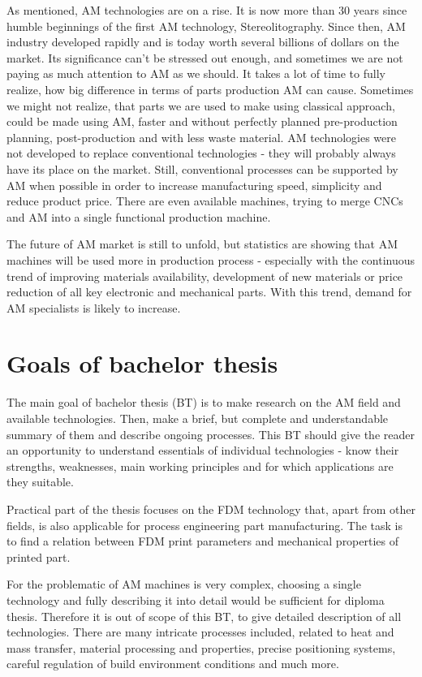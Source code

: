 \documentclass[a4paper, 11pt, reqno]{report}
\begin{document}
	As mentioned, AM technologies are on a rise. It is now more than 30 years since humble beginnings of the first AM technology, Stereolitography. Since then, AM industry developed rapidly and is today worth several billions of dollars on the market. Its significance can't be stressed out enough, and sometimes we are not paying as much attention to AM as we should. It takes a lot of time to fully realize, how big difference in terms of parts production AM can cause. Sometimes we might not realize, that parts we are used to make using classical approach, could be made using AM, faster and without perfectly planned pre-production planning, post-production and with less waste material. AM technologies were not developed to replace conventional technologies - they will probably always have its place on the market. Still, conventional processes can be supported by AM when possible in order to increase manufacturing speed, simplicity and reduce product price. There are even available machines, trying to merge CNCs and AM into a single functional production machine.
	
	The future of AM market is still to unfold, but statistics are showing that AM machines will be used more in production process - especially with the continuous trend of improving materials availability, development of new materials or price reduction of all key electronic and mechanical parts. With this trend, demand for AM specialists is likely to increase.
	
\section{Goals of bachelor thesis}	
	The main goal of bachelor thesis (BT) is to make research on the AM field and available technologies. Then, make a brief, but complete and understandable summary of them and describe ongoing processes. This BT should give the reader an opportunity to understand essentials of individual technologies - know their strengths, weaknesses, main working principles and for which applications are they suitable.
	
	Practical part of the thesis focuses on the FDM technology that, apart from other fields, is also applicable for process engineering part manufacturing. The task is to find a relation between FDM print parameters and mechanical properties of printed part.
	
	For the problematic of AM machines is very complex, choosing a single technology and fully describing it into detail would be sufficient for diploma thesis. Therefore it is out of scope of this BT, to give detailed description of all technologies. There are many intricate processes included, related to heat and mass transfer, material processing and properties, precise positioning systems, careful regulation of build environment conditions and much more.
%
\end{document}
